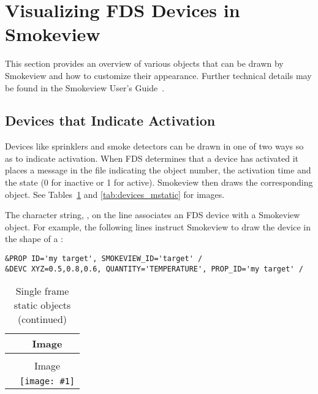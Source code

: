 
\newcommand{\devicewidth}{1.5in}
\newcommand{\boxwidth}{3.0in}
\newcommand{\incgraphics}[1]{
\parbox[c]{\devicewidth}{
\vspace{0.01in}
\texttt{[image: \#1]}
\vspace{0.01in}
}
}

\section{Visualizing FDS Devices in Smokeview}

This section provides an overview of various objects that can be drawn by Smokeview and how to customize their appearance. Further technical details may be found in the Smokeview User's Guide~\cite{Smokeview_Users_Guide}.


\subsection{Devices that Indicate Activation}
\label{info:SMOKEVIEW_ID}

Devices like sprinklers and smoke detectors can be drawn in one of two ways so as to indicate activation. When FDS determines that a device has activated it places a message in the  file indicating the object number, the activation time and the state (0 for inactive or 1 for active). Smokeview then draws the corresponding object. See Tables~\ref{tab:devices_static} and \ref{tab:devices_mstatic} for images.

The character string, , on the  line associates an FDS device with a Smokeview object. For example, the following lines instruct Smokeview to draw the device in the shape of a :
\begin{lstlisting}
&PROP ID='my target', SMOKEVIEW_ID='target' /
&DEVC XYZ=0.5,0.8,0.6, QUANTITY='TEMPERATURE', PROP_ID='my target' /
\end{lstlisting}


\begin{longtable}[t!]{|l|c|}
\caption{Single frame static objects}
\label{tab:devices_static}
\\ \hline
\ct{SMOKEVIEW_ID} & Image  \\ \hline \hline
\endfirsthead
\caption{Single frame static objects (continued)} \\ \hline
\ct{SMOKEVIEW_ID} & Image  \\ \hline \hline
\endhead

\ct{sensor} & \incgraphics{SCRIPT_FIGURES/sensor} \\ \hline
{} & \incgraphics{SCRIPT_FIGURES/target} \\ \hline

\end{longtable}

